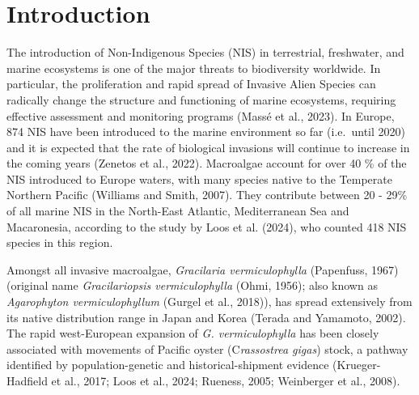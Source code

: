 \documentclass[
  letterpaper,
  DIV=11,
  numbers=noendperiod]{scrartcl}
\begin{document}
\section{Introduction}\label{introduction}

The introduction of Non-Indigenous Species (NIS) in terrestrial,
freshwater, and marine ecosystems is one of the major threats to
biodiversity worldwide. In particular, the proliferation and rapid
spread of Invasive Alien Species can radically change the structure and
functioning of marine ecosystems, requiring effective assessment and
monitoring programs (Massé et al., 2023). In Europe, 874 NIS have been
introduced to the marine environment so far (i.e.~until 2020) and it is
expected that the rate of biological invasions will continue to increase
in the coming years (Zenetos et al., 2022). Macroalgae account for over
40 \% of the NIS introduced to Europe waters, with many species native
to the Temperate Northern Pacific (Williams and Smith, 2007). They
contribute between 20 - 29\% of all marine NIS in the North-East
Atlantic, Mediterranean Sea and Macaronesia, according to the study by
Loos et al. (2024), who counted 418 NIS species in this region.

Amongst all invasive macroalgae, \emph{Gracilaria vermiculophylla}
(Papenfuss, 1967) (original name \emph{Gracilariopsis vermiculophylla}
(Ohmi, 1956); also known as \emph{Agarophyton vermiculophyllum} (Gurgel
et al., 2018)), has spread extensively from its native distribution
range in Japan and Korea (Terada and Yamamoto, 2002). The rapid
west-European expansion of \emph{G. vermiculophylla} has been closely
associated with movements of Pacific oyster (C\emph{rassostrea gigas})
stock, a pathway identified by population-genetic and
historical-shipment evidence (Krueger-Hadfield et al., 2017; Loos et
al., 2024; Rueness, 2005; Weinberger et al., 2008).
\end{document}
